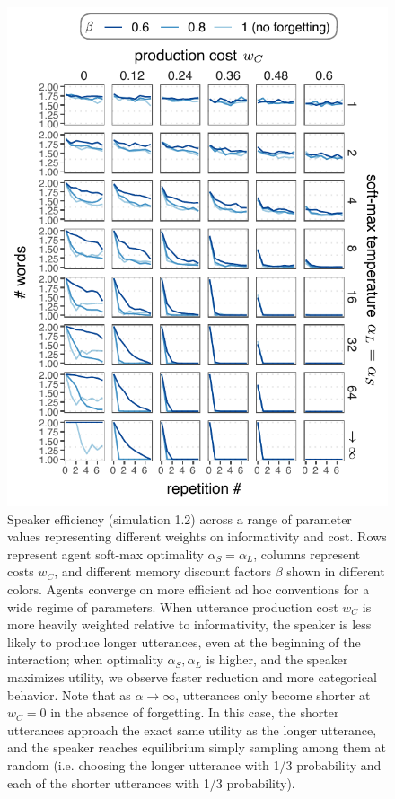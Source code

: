 \documentclass[10pt, jou, floatsintext]{apa7}
\begin{document}
 \begin{figure}
\centering
    \includegraphics[scale=1.2]{conjuction_grid.pdf}
  \caption{Speaker efficiency (simulation 1.2) across a range of parameter values representing different weights on informativity and cost. Rows represent agent soft-max optimality $\alpha_S = \alpha_L$, columns represent costs $w_C$, and different memory discount factors $\beta$ shown in different colors. Agents converge on more efficient ad hoc conventions for a wide regime of parameters. When utterance production cost $w_C$ is more heavily weighted relative to informativity, the speaker is less likely to produce longer utterances, even at the beginning of the interaction; when optimality $\alpha_S, \alpha_L$ is higher, and the speaker maximizes utility, we observe faster reduction and more categorical behavior. Note that as $\alpha\rightarrow\infty$, utterances only become shorter at $w_C=0$ in the absence of forgetting. In this case, the shorter utterances approach the exact same utility as the longer utterance, and the speaker reaches equilibrium simply sampling among them at random (i.e. choosing the longer utterance with 1/3 probability and each of the shorter utterances with 1/3 probability).}
  \label{fig:conjunction_grid}
\end{figure}
\end{document}
